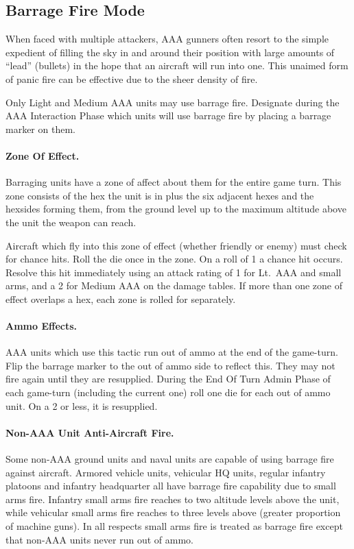 \subsection{Barrage Fire Mode}



When faced with multiple attackers, AAA gunners often resort to the simple expedient of filling the sky in and around their position with large amounts of “lead” (bullets) in the hope that an aircraft will run into one. This unaimed form of panic fire can be effective due to the sheer density of fire.

Only Light and Medium AAA units may use barrage fire. Designate during the AAA Interaction Phase which units will use barrage fire by placing a barrage marker on them.

\paragraph{Zone Of Effect.} Barraging units have a zone of affect about them for the entire game turn. This zone consists of the hex the unit is in plus the six adjacent hexes and the hexsides forming them, from the ground level up to the maximum altitude above the unit the weapon can reach.

Aircraft which fly into this zone of effect (whether friendly or enemy) must check for chance hits. Roll the die once  in the zone. On a roll of 1 a chance hit occurs. Resolve this hit immediately using an attack rating of 1 for Lt.\ AAA and small arms, and a 2 for Medium AAA on the damage tables. If more than one zone of effect overlaps a hex, each zone is rolled for separately.

\paragraph{Ammo Effects.} AAA units which use this tactic run out of ammo at the end of the game-turn. Flip the barrage marker to the out of ammo side to reflect this. They may not fire again until they are resupplied. During the End Of Turn Admin Phase of each game-turn (including the current one) roll one die for each out of ammo unit. On a 2 or less, it is resupplied.

\paragraph{Non-AAA Unit Anti-Aircraft Fire.} Some non-AAA ground units and naval units are capable of using barrage fire against aircraft. Armored vehicle units, vehicular HQ units, regular infantry platoons and infantry headquarter all have barrage fire capability due to small arms fire. Infantry small arms fire reaches to two altitude levels above the unit, while vehicular small arms fire reaches to three levels above (greater proportion of machine guns). In all respects small arms fire is treated as barrage fire except that non-AAA units never run out of ammo.

